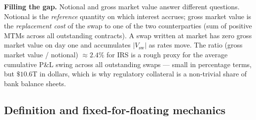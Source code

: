 \begin{tipblock}
\textbf{Filling the gap.} Notional and gross market value answer different
questions. Notional is the \emph{reference} quantity on which interest
accrues; gross market value is the \emph{replacement cost} of the swap
to one of the two counterparties (sum of positive MTMs across all
outstanding contracts). A swap written at market has zero gross market
value on day one and accumulates $|V_{\text{sw}}|$ as rates move. The
ratio (gross market value / notional) $\approx 2.4\%$ for IRS is a rough
proxy for the average cumulative P\&L swing across all outstanding swaps
--- small in percentage terms, but $\$10.6$T in dollars, which is why
regulatory collateral is a non-trivial share of bank balance sheets.
\end{tipblock}

\subsection{Definition and fixed-for-floating mechanics}\label{L4-sec:sw-def}

